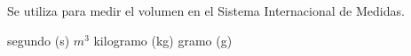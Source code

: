 
\question Se utiliza para medir el volumen en el Sistema Internacional de
Medidas.

  \begin{oneparchoices}
    \choice segundo (s)
    \CorrectChoice $m^3$
    \choice kilogramo (kg)
    \choice gramo (g)
  \end{oneparchoices}
  \answerline[B]
